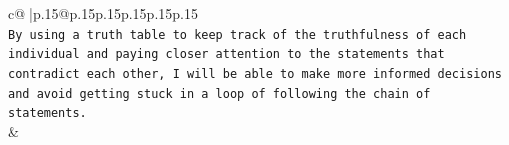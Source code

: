 \documentclass{article}
\begin{document}
{\begin{supertabular}{c@{$\;$}|p{.15\linewidth}@{}p{.15\linewidth}p{.15\linewidth}p{.15\linewidth}p{.15\linewidth}p{.15\linewidth}}
{{{\\ 
\texttt{By using a truth table to keep track of the truthfulness of each individual and paying closer attention to the statements that contradict each other, I will be able to make more informed decisions and avoid getting stuck in a loop of following the chain of statements.} \\
            }
        }
    }
    & \\ \\

\end{supertabular}
}
\end{document}

